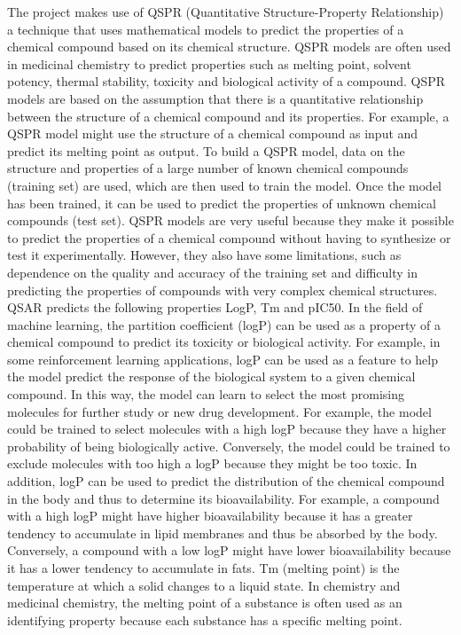 \documentclass[conference]{IEEEtran}
\begin{document}
The project makes use of QSPR (Quantitative Structure-Property Relationship) a technique that uses mathematical models to predict the properties of a chemical compound based on its chemical structure. QSPR models are often used in medicinal chemistry to predict properties such as melting point, solvent potency, thermal stability, toxicity and biological activity of a compound.
QSPR models are based on the assumption that there is a quantitative relationship between the structure of a chemical compound and its properties. For example, a QSPR model might use the structure of a chemical compound as input and predict its melting point as output. To build a QSPR model, data on the structure and properties of a large number of known chemical compounds (training set) are used, which are then used to train the model. Once the model has been trained, it can be used to predict the properties of unknown chemical compounds (test set).
QSPR models are very useful because they make it possible to predict the properties of a chemical compound without having to synthesize or test it experimentally. However, they also have some limitations, such as dependence on the quality and accuracy of the training set and difficulty in predicting the properties of compounds with very complex chemical structures.
QSAR predicts the following properties LogP, Tm and pIC50.
In the field of machine learning, the partition coefficient (logP) can be used as a property of a chemical compound to predict its toxicity or biological activity. For example, in some reinforcement learning applications, logP can be used as a feature to help the model predict the response of the biological system to a given chemical compound.
In this way, the model can learn to select the most promising molecules for further study or new drug development. For example, the model could be trained to select molecules with a high logP because they have a higher probability of being biologically active. Conversely, the model could be trained to exclude molecules with too high a logP because they might be too toxic.
In addition, logP can be used to predict the distribution of the chemical compound in the body and thus to determine its bioavailability. For example, a compound with a high logP might have higher bioavailability because it has a greater tendency to accumulate in lipid membranes and thus be absorbed by the body. Conversely, a compound with a low logP might have lower bioavailability because it has a lower tendency to accumulate in fats.
Tm (melting point) is the temperature at which a solid changes to a liquid state. In chemistry and medicinal chemistry, the melting point of a substance is often used as an identifying property because each substance has a specific melting point.
\end{document}
